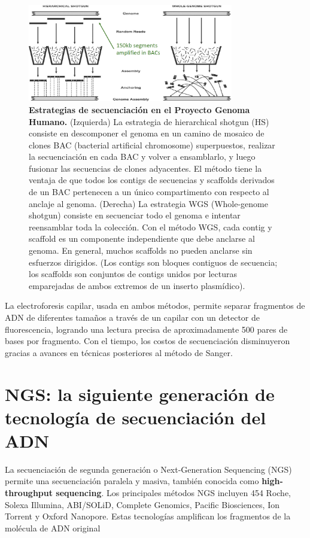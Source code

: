\begin{figure}[htbp]
\centering
\includegraphics[width = 0.8\textwidth]{figs/HGP-sequencing.png}
\caption{\textbf{Estrategias de secuenciación en el Proyecto Genoma Humano.} (Izquierda) La estrategia de hierarchical shotgun (HS) consiste en descomponer el genoma en un camino de mosaico de clones BAC (bacterial artificial chromosome) superpuestos, realizar la secuenciación en cada BAC y volver a ensamblarlo, y luego fusionar las secuencias de clones adyacentes. El método tiene la ventaja de que todos los contigs de secuencias y scaffolds derivados de un BAC pertenecen a un único compartimento con respecto al anclaje al genoma. (Derecha) La estrategia WGS (Whole-genome shotgun) consiste en secuenciar todo el genoma e intentar reensamblar toda la colección. Con el método WGS, cada contig y scaffold es un componente independiente que debe anclarse al genoma. En general, muchos scaffolds no pueden anclarse sin esfuerzos dirigidos. (Los contigs son bloques contiguos de secuencia; los scaffolds son conjuntos de contigs unidos por lecturas emparejadas de ambos extremos de un inserto plasmídico).}
\end{figure}
La electroforesis capilar, usada en ambos métodos, permite separar fragmentos de ADN de diferentes tamaños a través de un capilar con un detector de fluorescencia, logrando una lectura precisa de aproximadamente 500 pares de bases por fragmento. Con el tiempo, los costos de secuenciación disminuyeron gracias a avances en técnicas posteriores al método de Sanger.

\section{NGS: la siguiente generación de tecnología de secuenciación del ADN}
La secuenciación de segunda generación o Next-Generation Sequencing (NGS) permite una secuenciación paralela y masiva, también conocida como \textbf{high-throughput sequencing}. Los principales métodos NGS incluyen 454 Roche, Solexa Illumina, ABI/SOLiD, Complete Genomics, Pacific Biosciences, Ion Torrent y Oxford Nanopore. Estas tecnologías amplifican los fragmentos de la molécula de ADN original 

